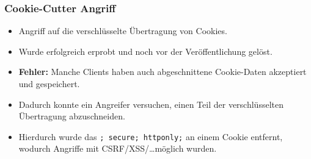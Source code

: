 \documentclass[a4paper, 11pt, accentcolor = tud3b]{tudreport}
\begin{document}
				\subsubsection{Cookie-Cutter Angriff}
					\begin{itemize}
						\item Angriff auf die verschlüsselte Übertragung von Cookies.
						\item Wurde erfolgreich erprobt und noch vor der Veröffentlichung gelöst.
						\item \textbf{Fehler:} Manche Clients haben auch abgeschnittene Cookie-Daten akzeptiert und gespeichert.
						\item Dadurch konnte ein Angreifer versuchen, einen Teil der verschlüsselten Übertragung abzuschneiden.
						\item Hierdurch wurde das \texttt{; secure; httponly;} an einem Cookie entfernt, wodurch Angriffe mit CSRF/XSS/\dots möglich wurden.
					\end{itemize}
			
\end{document}
